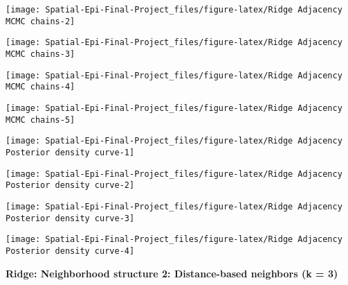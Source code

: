 \documentclass[]{article}
\begin{document}
\begin{center}\texttt{[image: Spatial-Epi-Final-Project\_files/figure-latex/Ridge Adjacency MCMC chains-2]} \end{center}

\begin{center}\texttt{[image: Spatial-Epi-Final-Project\_files/figure-latex/Ridge Adjacency MCMC chains-3]} \end{center}

\begin{center}\texttt{[image: Spatial-Epi-Final-Project\_files/figure-latex/Ridge Adjacency MCMC chains-4]} \end{center}

\begin{center}\texttt{[image: Spatial-Epi-Final-Project\_files/figure-latex/Ridge Adjacency MCMC chains-5]} \end{center}

\begin{center}\texttt{[image: Spatial-Epi-Final-Project\_files/figure-latex/Ridge Adjacency Posterior density curve-1]} \end{center}

\begin{center}\texttt{[image: Spatial-Epi-Final-Project\_files/figure-latex/Ridge Adjacency Posterior density curve-2]} \end{center}

\begin{center}\texttt{[image: Spatial-Epi-Final-Project\_files/figure-latex/Ridge Adjacency Posterior density curve-3]} \end{center}

\begin{center}\texttt{[image: Spatial-Epi-Final-Project\_files/figure-latex/Ridge Adjacency Posterior density curve-4]} \end{center}

\textbf{Ridge: Neighborhood structure 2: Distance-based neighbors (k =
3)}
\end{document}
